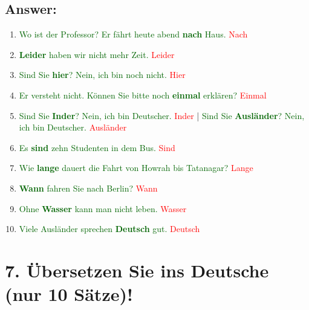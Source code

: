 \documentclass[12pt]{article}
\begin{document}
\subsection*{Answer:}
\begin{enumerate}
\item \textcolor{darkgreen}{Wo ist der Professor? Er fährt heute abend \textbf{nach} Haus.} \textcolor{red}{Nach}
\item \textcolor{darkgreen}{\textbf{Leider} haben wir nicht mehr Zeit.} \textcolor{red}{Leider}
\item \textcolor{darkgreen}{Sind Sie \textbf{hier}? Nein, ich bin noch nicht.} \textcolor{red}{Hier}
\item \textcolor{darkgreen}{Er versteht nicht. Können Sie bitte noch \textbf{einmal} erklären?} \textcolor{red}{Einmal}
\item \textcolor{darkgreen}{Sind Sie \textbf{Inder}? Nein, ich bin Deutscher.} \textcolor{red}{Inder} | \textcolor{darkgreen}{Sind Sie \textbf{Ausländer}? Nein, ich bin Deutscher.} \textcolor{red}{Ausländer}
\item \textcolor{darkgreen}{Es \textbf{sind} zehn Studenten in dem Bus.} \textcolor{red}{Sind}
\item \textcolor{darkgreen}{Wie \textbf{lange} dauert die Fahrt von Howrah bis Tatanagar?} \textcolor{red}{Lange}
\item \textcolor{darkgreen}{\textbf{Wann} fahren Sie nach Berlin?} \textcolor{red}{Wann}
\item \textcolor{darkgreen}{Ohne \textbf{Wasser} kann man nicht leben.} \textcolor{red}{Wasser}
\item \textcolor{darkgreen}{Viele Ausländer sprechen \textbf{Deutsch} gut.} \textcolor{red}{Deutsch}
\end{enumerate}


\vspace{1em}

\section*{7. Übersetzen Sie ins Deutsche (nur 10 Sätze)!}
\end{document}
